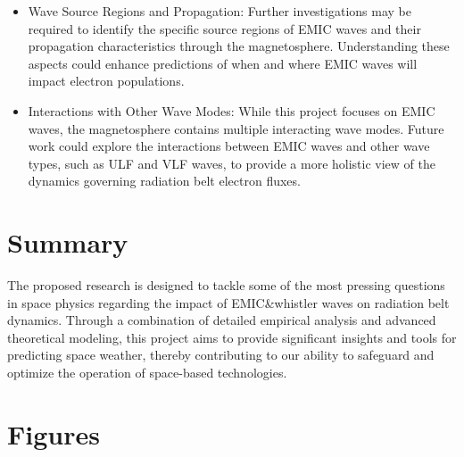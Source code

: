 \documentclass[
  letterpaper,
  DIV=11,
  numbers=noendperiod]{scrartcl}
\begin{document}
\begin{itemize}
\item
  Wave Source Regions and Propagation: Further investigations may be required to identify the specific source regions of EMIC waves and their propagation characteristics through the magnetosphere. Understanding these aspects could enhance predictions of when and where EMIC waves will impact electron populations.
\item
  Interactions with Other Wave Modes: While this project focuses on EMIC waves, the magnetosphere contains multiple interacting wave modes. Future work could explore the interactions between EMIC waves and other wave types, such as ULF and VLF waves, to provide a more holistic view of the dynamics governing radiation belt electron fluxes.
\end{itemize}

\section{Summary}\label{summary}

The proposed research is designed to tackle some of the most pressing questions in space physics regarding the impact of EMIC\&whistler waves on radiation belt dynamics. Through a combination of detailed empirical analysis and advanced theoretical modeling, this project aims to provide significant insights and tools for predicting space weather, thereby contributing to our ability to safeguard and optimize the operation of space-based technologies.

\section{Figures}\label{figures}
\end{document}
